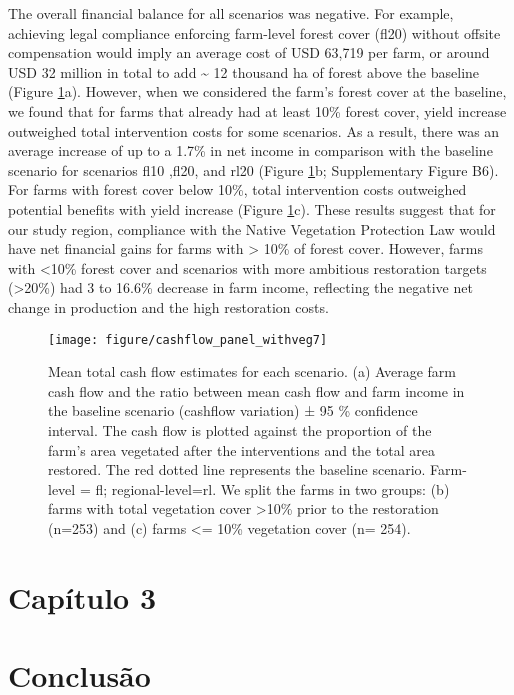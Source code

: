 \documentclass[
	12pt,				%
	oneside,			%
	a4paper,			%
	chapter=TITLE,		%
	section=TITLE,		%
	brazil,			%
	english				%
	]{abntex2}
\begin{document}
The overall financial balance for all scenarios was negative. For example, achieving legal compliance enforcing farm-level forest cover (fl20) without offsite compensation would imply an average cost of USD 63,719 per farm, or around USD 32 million in total to add \textasciitilde{} 12 thousand ha of forest above the baseline (Figure \ref{fig:fig4}a). However, when we considered the farm's forest cover at the baseline, we found that for farms that already had at least 10\% forest cover, yield increase outweighed total intervention costs for some scenarios. As a result, there was an average increase of up to a 1.7\% in net income in comparison with the baseline scenario for scenarios fl10 ,fl20, and rl20 (Figure \ref{fig:fig4}b; Supplementary Figure B6). For farms with forest cover below 10\%, total intervention costs outweighed potential benefits with yield increase (Figure \ref{fig:fig4}c). These results suggest that for our study region, compliance with the Native Vegetation Protection Law would have net financial gains for farms with \textgreater{} 10\% of forest cover. However, farms with \textless10\% forest cover and scenarios with more ambitious restoration targets (\textgreater20\%) had 3 to 16.6\% decrease in farm income, reflecting the negative net change in production and the high restoration costs.
\begin{figure}[H]

{\centering \texttt{[image: figure/cashflow\_panel\_withveg7]} 

}

\caption{Mean total cash flow estimates for each scenario. (a) Average farm cash flow and the ratio between mean cash flow and farm income in the baseline scenario (cashflow variation) ± 95 \% confidence interval. The cash flow is plotted against the proportion of the farm's area vegetated after the interventions and the total area restored. The red dotted line represents the baseline scenario. Farm-level = fl; regional-level=rl. We split the farms in two groups: (b) farms with total vegetation cover >10\% prior to the restoration (n=253) and (c)  farms <= 10\% vegetation cover (n= 254). }\label{fig:fig4}
\end{figure}
\hypertarget{capuxedtulo-3}{%
\chapter{Capítulo 3}\label{capuxedtulo-3}}

\hypertarget{conclusuxe3o}{%
\chapter{Conclusão}\label{conclusuxe3o}}
\end{document}
